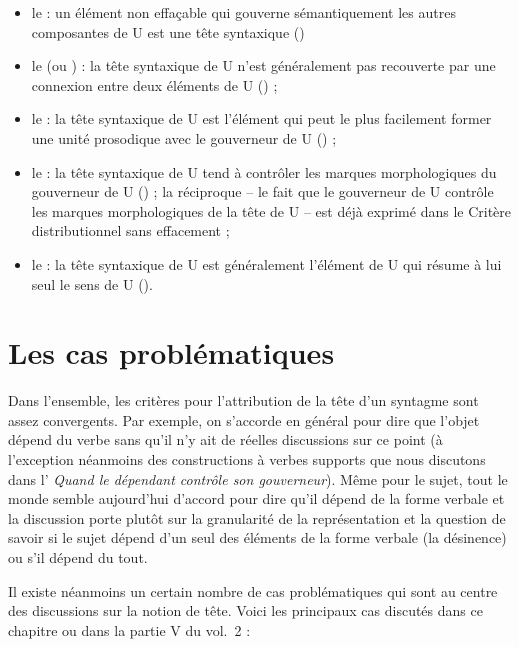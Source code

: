 \begin{itemize}
\item le  : un élément non effaçable qui gouverne sémantiquement les autres composantes de U est une tête syntaxique ()
\item le  (ou ) : la tête syntaxique de U n’est généralement pas recouverte par une connexion entre deux éléments de U () ;
\item le  : la tête syntaxique de U est l’élément qui peut le plus facilement former une unité prosodique avec le gouverneur de U () ;
\item\sloppy le  : la tête syntaxique de U tend à contrôler les marques morphologiques du gouverneur de U () ; la réciproque – le fait que le gouverneur de U contrôle les marques morphologiques de la tête de U – est déjà exprimé dans le Critère distributionnel sans effacement ;
\item le  : la tête syntaxique de U est généralement l’élément de U qui résume à lui seul le sens de U ().
\end{itemize}

\section{Les cas problématiques}\label{sec:3.3.21}

Dans l’ensemble, les critères pour l’attribution de la tête d’un syntagme sont assez convergents. Par exemple, on s’accorde en général pour dire que l’objet dépend du verbe sans qu’il n’y ait de réelles discussions sur ce point (à l’exception néanmoins des constructions à verbes supports que nous discutons dans l’ \textit{Quand le dépendant contrôle son gouverneur}). Même pour le sujet, tout le monde semble aujourd’hui d’accord pour dire qu’il dépend de la forme verbale et la discussion porte plutôt sur la granularité de la représentation et la question de savoir si le sujet dépend d’un seul des éléments de la forme verbale (la désinence) ou s’il dépend du tout.

Il existe néanmoins un certain nombre de cas problématiques qui sont au centre des discussions sur la notion de tête. Voici les principaux cas discutés dans ce chapitre ou dans la partie V du vol.\ 2 :

